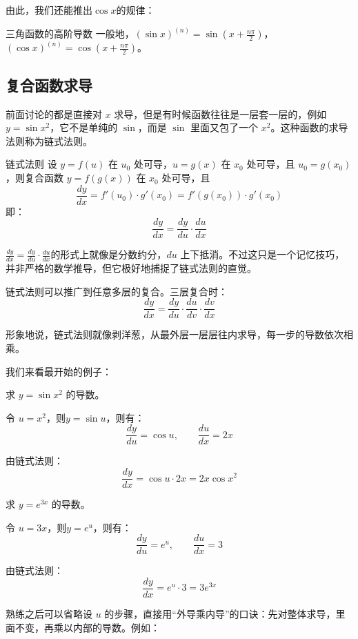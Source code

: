 由此，我们还能推出$\cos x$的规律：
\begin{theorem}{三角函数的高阶导数}{}
  一般地，$(\sin x)^{(n)} = \sin (x + \frac{n\pi}{2})$，$(\cos x)^{(n)} = \cos (x + \frac{n\pi}{2})$。
\end{theorem}

\subsection{复合函数求导}

前面讨论的都是直接对 $x$ 求导，但是有时候函数往往是一层套一层的，例如 $y = \sin x^2$，它不是单纯的 $\sin$，而是 $\sin$ 里面又包了一个 $x^2$。这种函数的求导法则称为链式法则。

\begin{theorem}{链式法则}{}
设 $y = f(u)$ 在 $u_0$ 处可导，$u = g(x)$ 在 $x_0$ 处可导，且 $u_0 = g(x_0)$，则复合函数 $y = f(g(x))$ 在 $x_0$ 处可导，且
\[
\frac{dy}{dx} = f'(u_0) \cdot g'(x_0) = f'(g(x_0)) \cdot g'(x_0)
\]
即：
\[
\frac{dy}{dx} = \frac{dy}{du} \cdot \frac{du}{dx}
\]
\end{theorem}

$\frac{dy}{dx} = \frac{dy}{du} \cdot \frac{du}{dx}$的形式上就像是分数约分，$du$ 上下抵消。不过这只是一个记忆技巧，并非严格的数学推导，但它极好地捕捉了链式法则的直觉。

链式法则可以推广到任意多层的复合。三层复合时：
\[
\frac{dy}{dx} = \frac{dy}{du} \cdot \frac{du}{dv} \cdot \frac{dv}{dx}
\]

形象地说，链式法则就像剥洋葱，从最外层一层层往内求导，每一步的导数依次相乘。

我们来看最开始的例子：
\begin{myexample}
  求 $y = \sin x^2$ 的导数。

  令 $u = x^2$，则$y = \sin u$，则有：
  \[
  \frac{dy}{du} = \cos u, \qquad \frac{du}{dx} = 2x
  \]

  由链式法则：
  \[
  \frac{dy}{dx} = \cos u \cdot 2x = 2x \cos x^2
  \]
\end{myexample}

\begin{myexample}
  求 $y = e^{3x}$ 的导数。

  令 $u = 3x$，则$y = e^u$，则有：
  \[
  \frac{dy}{du} = e^u, \qquad \frac{du}{dx} = 3
  \]

  由链式法则：
  \[
  \frac{dy}{dx} = e^u \cdot 3 = 3e^{3x}
  \]
\end{myexample}

熟练之后可以省略设 $u$ 的步骤，直接用“外导乘内导”的口诀：先对整体求导，里面不变，再乘以内部的导数。例如：

